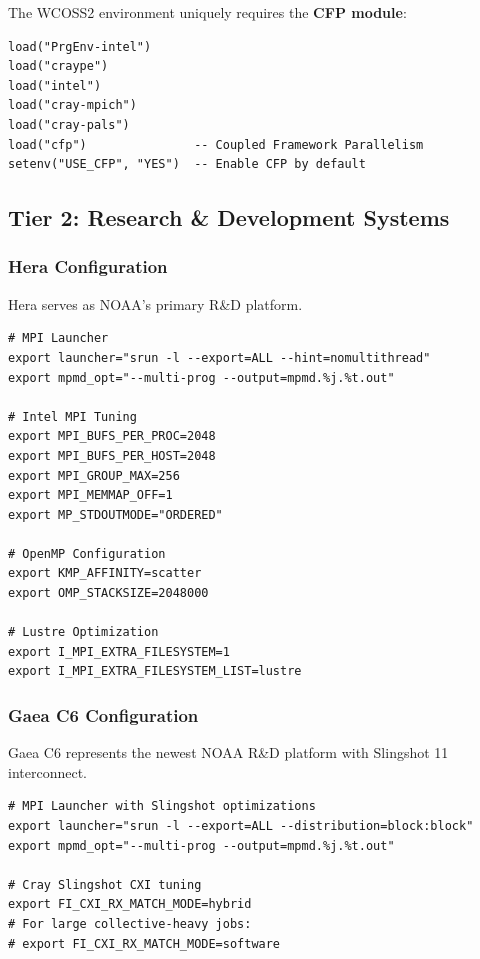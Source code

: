 \documentclass[11pt,a4paper,twoside]{article}
\begin{document}
The WCOSS2 environment uniquely requires the \textbf{CFP module}:

\begin{lstlisting}[style=luastyle,caption={WCOSS2 Runtime Modules (modulefiles/gw\_run.wcoss2.lua)},label={lst:wcoss2mod}]
load("PrgEnv-intel")
load("craype")
load("intel")
load("cray-mpich")
load("cray-pals")
load("cfp")               -- Coupled Framework Parallelism
setenv("USE_CFP", "YES")  -- Enable CFP by default
\end{lstlisting}

\subsection{Tier 2: Research \& Development Systems}

\subsubsection{Hera Configuration}

Hera serves as NOAA's primary R\&D platform.

\begin{lstlisting}[style=bashstyle,caption={Hera Launcher Configuration (env/HERA.env)},label={lst:hera}]
# MPI Launcher
export launcher="srun -l --export=ALL --hint=nomultithread"
export mpmd_opt="--multi-prog --output=mpmd.%j.%t.out"

# Intel MPI Tuning
export MPI_BUFS_PER_PROC=2048
export MPI_BUFS_PER_HOST=2048
export MPI_GROUP_MAX=256
export MPI_MEMMAP_OFF=1
export MP_STDOUTMODE="ORDERED"

# OpenMP Configuration
export KMP_AFFINITY=scatter
export OMP_STACKSIZE=2048000

# Lustre Optimization
export I_MPI_EXTRA_FILESYSTEM=1
export I_MPI_EXTRA_FILESYSTEM_LIST=lustre
\end{lstlisting}

\subsubsection{Gaea C6 Configuration}

Gaea C6 represents the newest NOAA R\&D platform with Slingshot 11 interconnect.

\begin{lstlisting}[style=bashstyle,caption={Gaea C6 Launcher Configuration (env/GAEAC6.env)},label={lst:gaeac6}]
# MPI Launcher with Slingshot optimizations
export launcher="srun -l --export=ALL --distribution=block:block"
export mpmd_opt="--multi-prog --output=mpmd.%j.%t.out"

# Cray Slingshot CXI tuning
export FI_CXI_RX_MATCH_MODE=hybrid
# For large collective-heavy jobs:
# export FI_CXI_RX_MATCH_MODE=software
\end{lstlisting}
\end{document}
